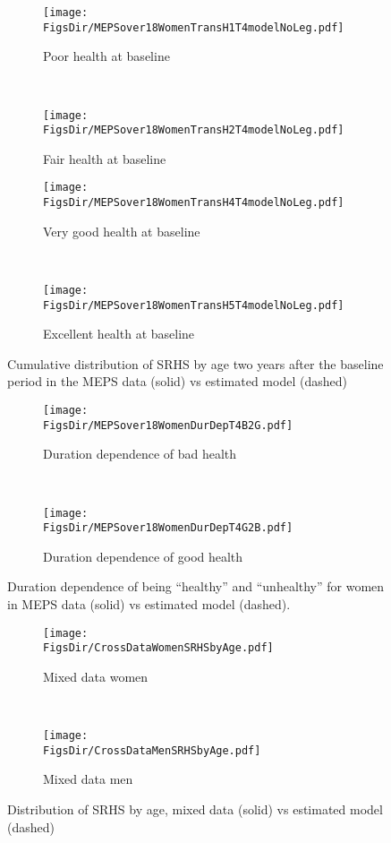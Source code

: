\documentclass[12pt,pdftex,letterpaper]{article}
\newcommand{\RootDir}{..}
\newcommand{\FigsDir}{\RootDir/Figures}
\begin{document}
\begin{figure}[H]
	\centering
	\begin{subfigure}[b]{0.45\textwidth}
		\texttt{[image: \\FigsDir/MEPSover18WomenTransH1T4modelNoLeg.pdf]}
		\caption{Poor health at baseline}\label{fig:Model4AheadPoor}
	\end{subfigure}
	~
	\begin{subfigure}[b]{0.45\textwidth}
		\texttt{[image: \\FigsDir/MEPSover18WomenTransH2T4modelNoLeg.pdf]}
		\caption{Fair health at baseline}\label{fig:Model4AheadFair}
	\end{subfigure}
	
	\begin{subfigure}[b]{0.45\textwidth}
		\texttt{[image: \\FigsDir/MEPSover18WomenTransH4T4modelNoLeg.pdf]}
		\caption{Very good health at baseline}\label{fig:Model4AheadVeryGood}
	\end{subfigure}
	~
	\begin{subfigure}[b]{0.45\textwidth}
		\texttt{[image: \\FigsDir/MEPSover18WomenTransH5T4modelNoLeg.pdf]}
		\caption{Excellent health at baseline}\label{fig:Model4AheadExcellent}
	\end{subfigure}
	\caption{Cumulative distribution of SRHS by age two years after the baseline period in the MEPS data (solid) vs estimated model (dashed)}\label{fig:ModelTransMEPS4ahead}
\end{figure}


\begin{figure}[H]
	\centering
	\begin{subfigure}[b]{0.48\textwidth}
		\texttt{[image: \\FigsDir/MEPSover18WomenDurDepT4B2G.pdf]}
		\caption{Duration dependence of bad health}\label{fig:DurDepMEPSwomenB2G}
	\end{subfigure}
	~
	\begin{subfigure}[b]{0.48\textwidth}
		\texttt{[image: \\FigsDir/MEPSover18WomenDurDepT4G2B.pdf]}
		\caption{Duration dependence of good health}\label{fig:DurDepMEPSwomenG2B}
	\end{subfigure}
\caption{Duration dependence of being ``healthy'' and ``unhealthy'' for women in MEPS data (solid) vs estimated model (dashed).}\label{fig:DurDepMEPSwomen}
\end{figure}

\newpage



\begin{figure}[H]
	\centering
	\begin{subfigure}[b]{0.48\textwidth}
		\texttt{[image: \\FigsDir/CrossDataWomenSRHSbyAge.pdf]}
		\caption{Mixed data women}\label{fig:MixedWomenSRHSfit}
	\end{subfigure}
	~
	\begin{subfigure}[b]{0.48\textwidth}
		\texttt{[image: \\FigsDir/CrossDataMenSRHSbyAge.pdf]}
		\caption{Mixed data men}\label{fig:MixedMenSRHSfit}
	\end{subfigure}
	\caption{Distribution of SRHS by age, mixed data (solid) vs estimated model (dashed)}\label{fig:SRHSfitMixed}
\end{figure}
\end{document}
